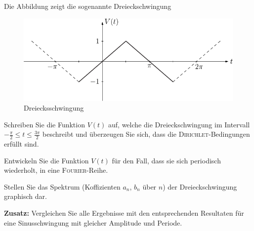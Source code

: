 \documentclass{atistandalonetask}
\begin{document}
  \begin{atiTask}[
    title = Dreiecksschwingung
  ]
	Die Abbildung zeigt die sogenannte Dreieckschwingung
	\begin{figure}[H]
	\centering
	\includegraphics[width=0.7\linewidth]{picture-fourier_iii}
	\caption{Dreiecksschwingung}
	\end{figure}

	\begin{atiSubtasks}
		\item
		Schreiben Sie die Funktion $V(t)$ auf, welche die Dreieckschwingung im Intervall $-\frac{\pi}{2}\leq t\leq \frac{3\pi}{2}$ beschreibt und überzeugen Sie sich, dass die \textsc{Dirichlet}-Bedingungen erfüllt sind.
		\item Entwickeln Sie die Funktion $V(t)$ für den Fall, dass sie sich periodisch wiederholt, in eine \textsc{Fourier}-Reihe. 
		\item Stellen Sie das Spektrum (Koffizienten $a_n$, $b_n$ über $n$) der Dreieckschwingung graphisch dar.
		\item \textbf{Zusatz:} Vergleichen Sie alle Ergebnisse mit den entsprechenden Resultaten für eine Sinusschwingung mit gleicher Amplitude und Periode. 
	\end{atiSubtasks} 
  \end{atiTask}
  \begin{atiSolution}
   
  \end{atiSolution}
\end{document}
